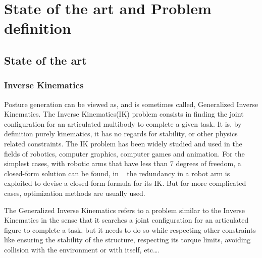 
\chapter{State of the art and Problem definition}
\label{cha:state_of_the_art_and_problem_definition}

\graphicspath{{Chapter1-State-of-the-art/Figs/}}

\section{State of the art}
\label{sec:state_of_the_art}

\subsection{Inverse Kinematics}
\label{sub:inverse_kinematics}

Posture generation can be viewed as, and is sometimes called, Generalized Inverse Kinematics.
The Inverse Kinematics(IK) problem consists in finding the joint configuration for an articulated multibody to complete a given task.
It is, by definition purely kinematics, it has no regards for stability, or other physics related constraints.
The IK problem has been widely studied and used in the fields of robotics, computer graphics, computer games and animation.
For the simplest cases, with robotic arms that have less than 7 degrees of freedom, a closed-form solution can be found, in ~\cite{asfour2003human} the redundancy in a robot arm is exploited to devise a closed-form formula for its IK.
But for more complicated cases, optimization methods are usually used.

The Generalized Inverse Kinematics refers to a problem similar to the Inverse Kinematics in the sense that it searches a joint configuration for an articulated figure to complete a task, but it needs to do so while respecting other constraints like ensuring the stability of the structure, respecting its torque limits, avoiding collision with the environment or with itself, etc\ldots.



